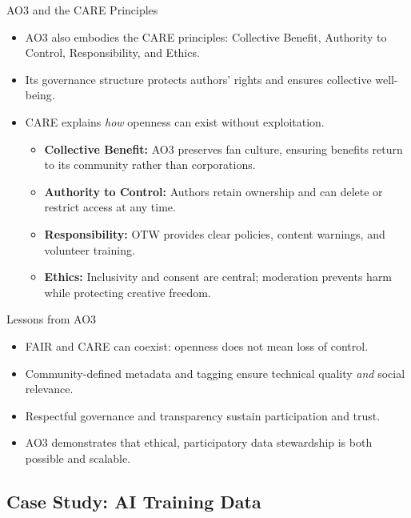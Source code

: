 \documentclass[aspectratio=169]{beamer}
\begin{document}
\begin{frame}{AO3 and the CARE Principles}
\begin{itemize}
  \item AO3 also embodies the CARE principles: Collective Benefit, Authority to Control, Responsibility, and Ethics.  
  \item Its governance structure protects authors’ rights and ensures collective well-being.  
  \item CARE explains \emph{how} openness can exist without exploitation.
\begin{itemize}
  \item \textbf{Collective Benefit:} AO3 preserves fan culture, ensuring benefits return to its community rather than corporations.  
  \item \textbf{Authority to Control:} Authors retain ownership and can delete or restrict access at any time.  
  \item \textbf{Responsibility:} OTW provides clear policies, content warnings, and volunteer training.  
  \item \textbf{Ethics:} Inclusivity and consent are central; moderation prevents harm while protecting creative freedom.
  \end{itemize}
\end{itemize}
\end{frame}

\begin{frame}{Lessons from AO3}
\begin{itemize}
  \item FAIR and CARE can coexist: openness does not mean loss of control.  
  \item Community-defined metadata and tagging ensure technical quality \emph{and} social relevance.  
  \item Respectful governance and transparency sustain participation and trust.  
  \item AO3 demonstrates that ethical, participatory data stewardship is both possible and scalable.
\end{itemize}

\end{frame}

\subsection{Case Study: AI Training Data}
\end{document}
